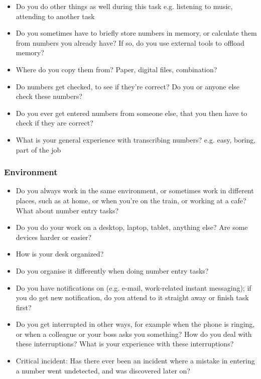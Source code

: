 \begin{itemize}
\item Do you do other things as well during this task
e.g. listening to music, attending to another task
\item Do you sometimes have to briefly store numbers in memory, or calculate them from numbers you already have?
If so, do you use external tools to offload memory?
\item Where do you copy them from? Paper, digital files, combination?
\item Do numbers get checked, to see if they're correct? Do you or anyone else check these numbers?
\item Do you ever get entered numbers from someone else, that you then have to check if they are correct?
\item What is your general experience with transcribing numbers?
e.g. easy, boring, part of the job
\end{itemize}
\subsubsection{Environment}
\begin{itemize}
\item Do you always work in the same environment, or sometimes work in different places, such as at home, or when you're on the train, or working at a cafe? What about number entry tasks?
\item Do you do your work on a desktop, laptop, tablet, anything else? Are some devices harder or easier?
\item How is your desk organized?
\item Do you organise it differently when doing number entry tasks?
\item Do you have notifications on (e.g. e-mail, work-related instant messaging); if you do get new notification, do you attend to it straight away or finish task first?
\item Do you get interrupted in other ways, for example when the phone is ringing, or when a colleague or your boss asks you something? How do you deal with these interruptions? What is your experience with these interruptions?
\item Critical incident: Has there ever been an incident where a mistake in entering a number went undetected, and was discovered later on?
\end{itemize}
